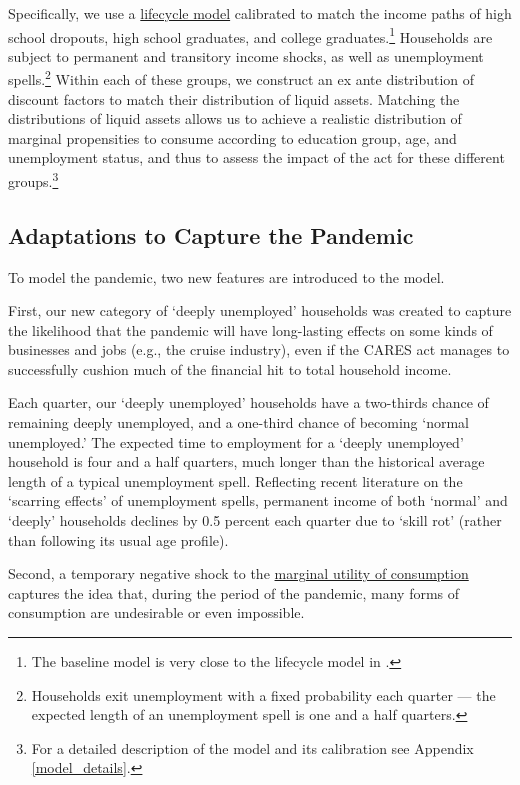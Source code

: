 \documentclass[titlepage]{\econtex}
\begin{document}
Specifically, we use a \href{https://pubs.aeaweb.org/doi/pdfplus/10.1257/jep.15.3.3}{lifecycle model} calibrated to match the income paths of high school dropouts, high school graduates, and college graduates.\footnote{The baseline model is very close to the lifecycle model in \cite{cstwMPC}.}
Households are subject to permanent and transitory income shocks, as well as unemployment spells.\footnote{Households exit unemployment with a fixed probability each quarter --- the expected length of an unemployment spell is one and a half quarters.}
Within each of these groups, we construct an ex ante distribution of discount factors to match their distribution of liquid assets.  
Matching the distributions of liquid assets allows us to achieve a realistic distribution of marginal propensities to consume according to education group, age, and unemployment status, and thus to assess the impact of the act for these different groups.\footnote{For a detailed description of the model and its calibration see Appendix \ref{model_details}.}

\subsection{Adaptations to Capture the Pandemic}

To model the pandemic, two new features are introduced to the model.

First, our new category of `deeply unemployed' households was created to capture the likelihood that the pandemic will have long-lasting effects on some kinds of businesses and jobs (e.g., the cruise industry), even if the CARES act manages to successfully cushion much of the financial hit to total household income.

Each quarter, our `deeply unemployed' households have a two-thirds chance of remaining deeply unemployed, and a one-third chance of becoming `normal unemployed.'
The expected time to employment for a `deeply unemployed' household is four and a half quarters, much longer than the historical average length of a typical unemployment spell.  Reflecting recent literature on the `scarring effects' of unemployment spells, permanent income of both `normal' and `deeply' households declines by 0.5 percent each quarter due to `skill rot' (rather than following its usual age profile).

Second, a temporary negative shock to the \href{https://www.investopedia.com/terms/m/marginalutility.asp}{marginal utility of consumption} captures the idea that, during the period of the pandemic, many forms of consumption are undesirable or even impossible.
\end{document}

